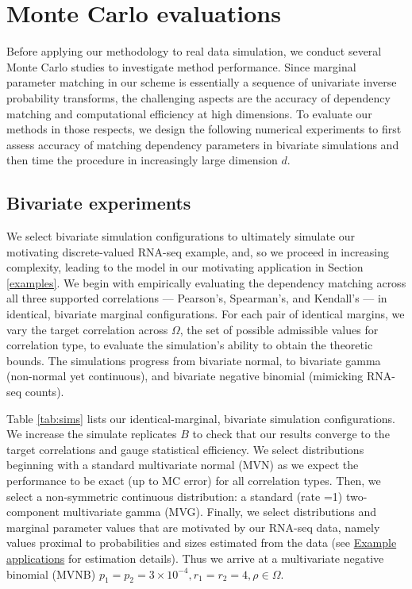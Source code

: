 \documentclass[
]{jss}
\begin{document}
\hypertarget{simulations}{%
\section{Monte Carlo evaluations}\label{simulations}}

Before applying our methodology to real data simulation, we conduct several Monte Carlo studies to investigate method performance. Since marginal parameter matching in our scheme is essentially a sequence of univariate inverse probability transforms, the challenging aspects are the accuracy of dependency matching and computational efficiency at high dimensions. To evaluate our methods in those respects, we design the following numerical experiments to first assess accuracy of matching dependency parameters in bivariate simulations and then time the procedure in increasingly large dimension \(d\).

\hypertarget{bivariate-experiments}{%
\subsection{Bivariate experiments}\label{bivariate-experiments}}

We select bivariate simulation configurations to ultimately simulate our motivating discrete-valued RNA-seq example, and, so we proceed in increasing complexity, leading to the model in our motivating application in Section \ref{examples}. We begin with empirically evaluating the dependency matching across all three supported correlations --- Pearson's, Spearman's, and Kendall's --- in identical, bivariate marginal configurations. For each pair of identical margins, we vary the target correlation across \(\Omega\), the set of possible admissible values for correlation type, to evaluate the simulation's ability to obtain the theoretic bounds. The simulations progress from bivariate normal, to bivariate gamma (non-normal yet continuous), and bivariate negative binomial (mimicking RNA-seq counts).

Table \ref{tab:sims} lists our identical-marginal, bivariate simulation configurations. We increase the simulate replicates \(B\) to check that our results converge to the target correlations and gauge statistical efficiency. We select distributions beginning with a standard multivariate normal (MVN) as we expect the performance to be exact (up to MC error) for all correlation types. Then, we select a non-symmetric continuous distribution: a standard (rate =1) two-component multivariate gamma (MVG). Finally, we select distributions and marginal parameter values that are motivated by our RNA-seq data, namely values proximal to probabilities and sizes estimated from the data (see \href{examples}{Example applications} for estimation details). Thus we arrive at a multivariate negative binomial (MVNB) \(p_1 = p_2 = 3\times10^{-4}, r_1 = r_2 = 4, \rho \in \Omega\).
\end{document}

